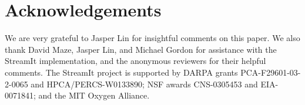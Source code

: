 \section{Acknowledgements}

We are very grateful to Jasper Lin for insightful comments on this
paper.  We also thank David Maze, Jasper Lin, and Michael Gordon for
assistance with the StreamIt implementation, and the anonymous
reviewers for their helpful comments.  The StreamIt project is
supported by DARPA grants PCA-F29601-03-2-0065 and
HPCA/PERCS-W0133890; NSF awards CNS-0305453 and EIA-0071841; and the
MIT Oxygen Alliance.
